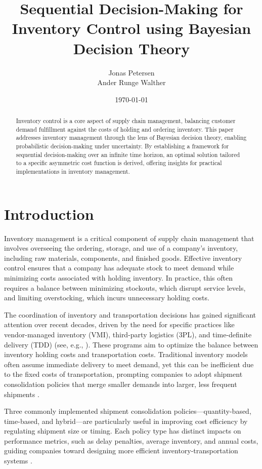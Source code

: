 \documentclass[a4paper,12pt]{article}
\title{Sequential Decision-Making for Inventory Control using Bayesian Decision Theory}
\author{Jonas Petersen \\ Ander Runge Walther }
\date{\today}
\theoremstyle{definition}
\begin{document}
	\maketitle
	
	\begin{abstract}
		Inventory control is a core aspect of supply chain management, balancing customer demand fulfillment against the costs of holding and ordering inventory. This paper addresses inventory management through the lens of Bayesian decision theory, enabling probabilistic decision-making under uncertainty. By establishing a framework for sequential decision-making over an infinite time horizon, an optimal solution tailored to a specific asymmetric cost function is derived, offering insights for practical implementations in inventory management.
	\end{abstract}
	
	\section{Introduction}
	Inventory management is a critical component of supply chain management that involves overseeing the ordering, storage, and use of a company's inventory, including raw materials, components, and finished goods. Effective inventory control ensures that a company has adequate stock to meet demand while minimizing costs associated with holding inventory. In practice, this often requires a balance between minimizing stockouts, which disrupt service levels, and limiting overstocking, which incurs unnecessary holding costs.
	
	The coordination of inventory and transportation decisions has gained significant attention over recent decades, driven by the need for specific practices like vendor-managed inventory (VMI), third-party logistics (3PL), and time-definite delivery (TDD) (see, e.g., \citep{CetinkayaLee2000, Alumur2012, Gurler2014}). These programs aim to optimize the balance between inventory holding costs and transportation costs. Traditional inventory models often assume immediate delivery to meet demand, yet this can be inefficient due to the fixed costs of transportation, prompting companies to adopt shipment consolidation policies that merge smaller demands into larger, less frequent shipments \citep{CetinkayaBookbinder2003, HigginsonBookbinder1994}.
	
	Three commonly implemented shipment consolidation policies—quantity-based, time-based, and hybrid—are particularly useful in improving cost efficiency by regulating shipment size or timing. Each policy type has distinct impacts on performance metrics, such as delay penalties, average inventory, and annual costs, guiding companies toward designing more efficient inventory-transportation systems \citep{Cetinkaya2005, Wei2020, Cetinkaya2006}.
	
\end{document}
